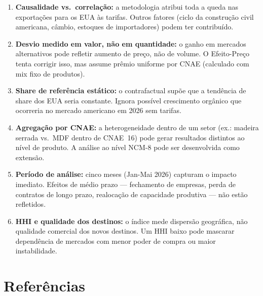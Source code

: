 \documentclass[12pt, a4paper]{article}
\begin{document}
\begin{enumerate}
  \item \textbf{Causalidade vs.\ correlação:} a metodologia atribui toda a
    queda nas exportações para os EUA às tarifas. Outros fatores (ciclo da
    construção civil americana, câmbio, estoques de importadores) podem ter
    contribuído.

  \item \textbf{Desvio medido em valor, não em quantidade:} o ganho em
    mercados alternativos pode refletir aumento de preço, não de volume.
    O Efeito-Preço tenta corrigir isso, mas assume prêmio uniforme
    por CNAE (calculado com mix fixo de produtos).

  \item \textbf{Share de referência estático:} o contrafactual supõe que
    a tendência de share dos EUA seria constante. Ignora possível crescimento
    orgânico que ocorreria no mercado americano em 2026 sem tarifas.

  \item \textbf{Agregação por CNAE:} a heterogeneidade dentro de um setor
    (ex.: madeira serrada vs.\ MDF dentro de CNAE~16) pode gerar resultados
    distintos ao nível de produto. A análise ao nível NCM-8 pode ser
    desenvolvida como extensão.

  \item \textbf{Período de análise:} cinco meses (Jan-Mai 2026) capturam o
    impacto imediato. Efeitos de médio prazo --- fechamento de empresas,
    perda de contratos de longo prazo, realocação de capacidade produtiva
    --- não estão refletidos.

  \item \textbf{HHI e qualidade dos destinos:} o índice mede dispersão
    geográfica, não qualidade comercial dos novos destinos. Um HHI baixo
    pode mascarar dependência de mercados com menor poder de compra
    ou maior instabilidade.
\end{enumerate}

\section*{Referências}
\end{document}
